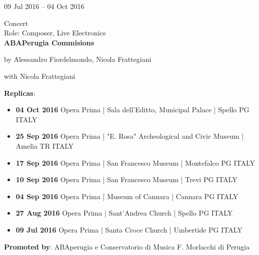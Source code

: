 \documentclass[7pt,a4paper]{article}
\begin{document}
\begin{mdframed}[
    backgroundcolor=white,
    linecolor=white,
    linewidth=0pt,
    innerleftmargin=6pt,
    innerrightmargin=6pt,
    innertopmargin=6pt,
    innerbottommargin=6pt,
    skipabove=0pt,
    skipbelow=0pt
]

\begin{minipage}[t]{0.28\textwidth}

09 Jul 2016 – 04 Oct 2016


\end{minipage}
\begin{minipage}[t]{0.68\textwidth}
\small Concert
\\\scriptsize Role: Composer, Live Electronics
\\ \normalsize \textbf{ABAPerugia Commisions}
\par\scriptsize by Alessandro Fiordelmondo, Nicola Frattegiani
\par\scriptsize with Nicola Frattegiani
\vspace{0.25cm}



    \scriptsize \textbf{Replicas}:
    \begin{itemize}
    \par
        \item  \textbf{04 Oct 2016}  Opera Prima  | Sala dell'Editto, Municipal Palace  | Spello PG ITALY
    \par
        \item  \textbf{25 Sep 2016}  Opera Prima  | "E. Rosa" Archeological and Civic Museum  | Amelia TR ITALY
    \par
        \item  \textbf{17 Sep 2016}  Opera Prima  | San Francesco Museum  | Montefalco PG ITALY
    \par
        \item  \textbf{10 Sep 2016}  Opera Prima  | San Francesco Museum  | Trevi PG ITALY
    \par
        \item  \textbf{04 Sep 2016}  Opera Prima  | Museum of Cannara  | Cannara PG ITALY
    \par
        \item  \textbf{27 Aug 2016}  Opera Prima  | Sant'Andrea Church  |  Spello PG ITALY
    \par
        \item  \textbf{09 Jul 2016}  Opera Prima  | Santa Croce Church  | Umbertide PG ITALY
    
    \end{itemize}

\vspace{0.1cm}
\scriptsize

\vspace{0.1cm}
\par \textbf{Promoted by}: ABAperugia e Conservatorio di Musica F. Morlacchi di Perugia
\end{minipage}
\vspace{0.25cm}
\end{mdframed}
\end{document}
